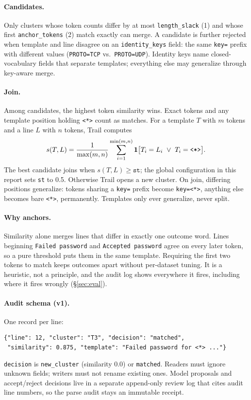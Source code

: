 \documentclass[11pt]{article}
\newcommand{\wild}{\texttt{<*>}}
\begin{document}
\paragraph{Candidates.} Only clusters whose token counts differ by at
most \texttt{length\_slack} (1) and whose first \texttt{anchor\_tokens}
(2) match exactly can merge. A candidate is further rejected when
template and line disagree on an \texttt{identity\_keys} field: the
same \texttt{key=} prefix with different values
(\texttt{PROTO=TCP} vs.\ \texttt{PROTO=UDP}). Identity keys name
closed-vocabulary fields that separate templates; everything else may
generalize through key-aware merge.

\paragraph{Join.} Among candidates, the highest token similarity wins.
Exact tokens and any template position holding \wild{} count as
matches. For a template $T$ with $m$ tokens and a line $L$ with $n$
tokens, Trail computes
\begin{equation*}
s(T,L)=\frac{1}{\max(m,n)}
\sum_{i=1}^{\min(m,n)}
\mathbf{1}\bigl[T_i=L_i\ \lor\ T_i=\mbox{\wild}\bigr].
\end{equation*}
The best candidate joins when $s(T,L)\geq\texttt{st}$; the global
configuration in this report sets \texttt{st} to 0.5. Otherwise Trail
opens a new cluster. On join, differing
positions generalize: tokens sharing a \texttt{key=} prefix become
\texttt{key=}\wild{}, anything else becomes bare \wild{}, permanently.
Templates only ever generalize, never split.

\paragraph{Why anchors.} Similarity alone merges lines that differ in
exactly one outcome word. Lines beginning \texttt{Failed password}
and \texttt{Accepted password} agree on every later token, so a
pure threshold puts them in the same template. Requiring the first two
tokens to match keeps outcomes apart without per-dataset tuning. It is
a heuristic, not a principle, and the audit log shows everywhere it
fires, including where it fires wrongly (\S\ref{sec:eval}).

\paragraph{Audit schema (v1).} One record per line:
\begin{lstlisting}
{"line": 12, "cluster": "T3", "decision": "matched",
 "similarity": 0.875, "template": "Failed password for <*> ..."}
\end{lstlisting}
\texttt{decision} is \texttt{new\_cluster} (similarity 0.0) or
\texttt{matched}. Readers must ignore unknown fields; writers must not
rename existing ones. Model proposals and accept/reject decisions live
in a separate append-only review log that cites audit line numbers, so
the parse audit stays an immutable receipt.
\end{document}
